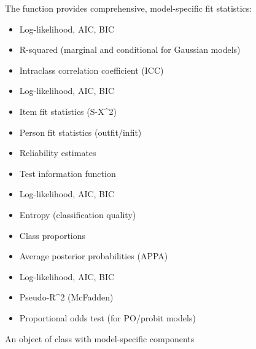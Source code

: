 \documentclass[a4paper]{book}
\begin{document}
\begin{Details}
The  function provides comprehensive, model-specific fit statistics:

\begin{itemize}

\item{} Log-likelihood, AIC, BIC
\item{} R-squared (marginal and conditional for Gaussian models)
\item{} Intraclass correlation coefficient (ICC)

\end{itemize}


\begin{itemize}

\item{} Log-likelihood, AIC, BIC
\item{} Item fit statistics (S-X\textasciicircum{}2)
\item{} Person fit statistics (outfit/infit)
\item{} Reliability estimates
\item{} Test information function

\end{itemize}


\begin{itemize}

\item{} Log-likelihood, AIC, BIC
\item{} Entropy (classification quality)
\item{} Class proportions
\item{} Average posterior probabilities (APPA)

\end{itemize}


\begin{itemize}

\item{} Log-likelihood, AIC, BIC
\item{} Pseudo-R\textasciicircum{}2 (McFadden)
\item{} Proportional odds test (for PO/probit models)

\end{itemize}

\end{Details}
%
\begin{Value}
An object of class  with model-specific components
\end{Value}
\end{document}
